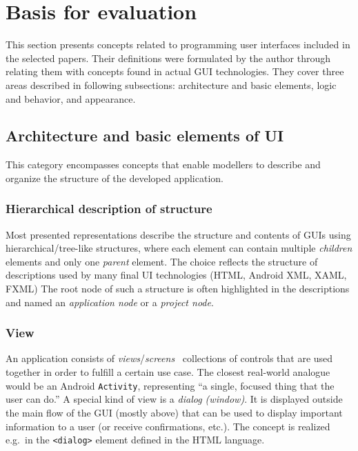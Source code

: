 \section{Basis for evaluation}\label{sec:basis-for-evaluation}

This section presents concepts related to programming user interfaces included in the selected papers.
Their definitions were formulated by the author through relating them with concepts found in actual GUI technologies.
They cover three areas described in following subsections: architecture and basic elements, logic and behavior, and appearance.

\subsection{Architecture and basic elements of UI}\label{subsec:architecture-and-basic-elements-of-ui}
This category encompasses concepts that enable modellers to describe and organize the structure of the developed application.

\subsubsection{Hierarchical description of structure}
Most presented representations describe the structure and contents of GUIs using hierarchical/tree-like structures, where each element can contain multiple \emph{children} elements and only one \emph{parent} element.
The choice reflects the structure of descriptions used by many final UI technologies (HTML, Android XML, XAML, FXML)
The root node of such a structure is often highlighted in the descriptions and named an \emph{application node} or a \emph{project node}.

\subsubsection{View}
An application consists of \emph{views}/\emph{screens} \textendash\ collections of controls that are used together in order to fulfill a certain use case.
The closest real-world analogue would be an Android \texttt{Activity}, representing \enquote{a single, focused thing that the user can do.}
A special kind of view is a \emph{dialog (window)}.
It is displayed outside the main flow of the GUI (mostly above) that can be used to display important information to a user (or receive confirmations, etc.).
The concept is realized e.g.\ in the \texttt{<dialog>} element defined in the HTML language.

